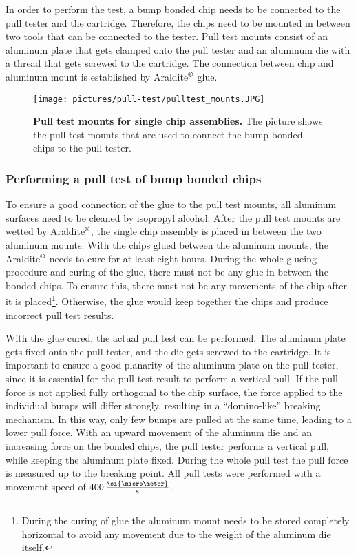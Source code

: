 In order to perform the test, a bump bonded chip needs to be connected to the pull tester and the cartridge. Therefore, the chips need to be mounted in between two tools that can be connected to the tester. Pull test mounts consist of an aluminum plate that gets clamped onto the pull tester and an aluminum die with a thread that gets screwed to the cartridge. The connection between chip and aluminum mount is established by Araldite$\rm{\symbR}$ glue.

\begin{figure}
\begin{center}
\texttt{[image: pictures/pull-test/pulltest\_mounts.JPG]}
\end{center}
\caption[Pull test mounts for single chip assemblies]{\textbf{Pull test mounts for single chip assemblies.} The picture shows the pull test mounts that are used to connect the bump bonded chips to the pull tester.}\label{pic:pull-test_mounts}
\end{figure}

\subsubsection{Performing a pull test of bump bonded chips}
To ensure a good connection of the glue to the pull test mounts, all aluminum surfaces need to be cleaned by isopropyl alcohol. After the pull test mounts are wetted by Araldite$\rm{\symbR}$, the single chip assembly is placed in between the two aluminum mounts. With the chips glued between the aluminum mounts, the Araldite$\rm{\symbR}$ needs to cure for at least eight hours. During the whole glueing procedure and curing of the glue, there must not be any glue in between the bonded chips. To ensure this, there must not be any movements of the chip after it is placed\footnote{During the curing of glue the aluminum mount needs to be stored completely horizontal to avoid any movement due to the weight of the aluminum die itself.}. Otherwise, the glue would keep together the chips and produce incorrect pull test results.

With the glue cured, the actual pull test can be performed. The aluminum plate gets fixed onto the pull tester, and the die gets screwed to the cartridge. It is important to ensure a good planarity of the aluminum plate on the pull tester, since it is essential for the pull test result to perform a vertical pull. If the pull force is not applied fully orthogonal to the chip surface, the force applied to the individual bumps will differ strongly, resulting in a ``domino-like'' breaking mechanism. In this way, only few bumps are pulled at the same time, leading to a lower pull force. With an upward movement of the aluminum die and an increasing force on the bonded chips, the pull tester performs a vertical pull, while keeping the aluminum plate fixed. During the whole pull test the pull force is measured up to the breaking point. All pull tests were performed with a movement speed of $400\,\frac{\si{\micro \meter}}{\rm{s}}$.


